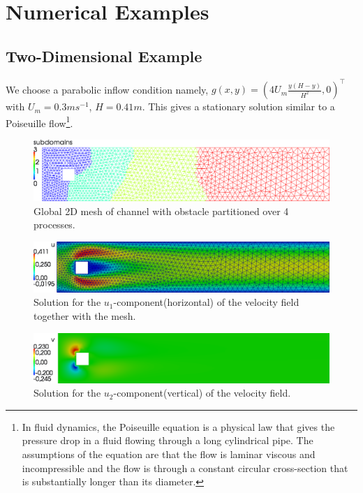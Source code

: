 \documentclass[a4paper, 11pt, twoside]{article}
\begin{document}
\section{Numerical Examples}

\subsection{Two-Dimensional Example}\label{section2D}
We choose a parabolic inflow condition namely, $g (x, y)= (4 U_m \frac {y (H-y)}{H^2},  0)^\top$ with $U_m = 0.3 ms^{-1}$, $H=0.41m$. 
This gives a stationary solution similar to a Poiseuille flow\footnote{In fluid dynamics, the Poiseuille equation is a physical 
law that gives the pressure drop in a fluid flowing through a long cylindrical pipe. The assumptions of the equation are that the flow is 
laminar viscous and incompressible and the flow is through a constant circular cross-section that is substantially longer than its diameter.}.


\begin{figure}[h!]
	\centering
		\includegraphics[width=1.1\textwidth]{fig/mesh_flow_tutorial_on_4_processes_trans.png}
\caption{Global 2D mesh of channel with obstacle partitioned over 4 processes.}
\label{mesh}
\end{figure}

\begin{figure}[h!]
	\centering
		\includegraphics[width=1.1\textwidth]{fig/u_velocity_with_mesh_flow_tutorial_trans.png}
\caption{Solution for the $u_1$-component(horizontal) of the velocity field together with the mesh.}
\label{sol_u1}
\end{figure}

\begin{figure}[h!]
	\centering
		\includegraphics[width=1.1\textwidth]{fig/v_velocity_flow_tutorial_trans.png}
\caption{Solution for the $u_2$-component(vertical) of the velocity field.}
\label{sol_u2}
\end{figure}
\end{document}
